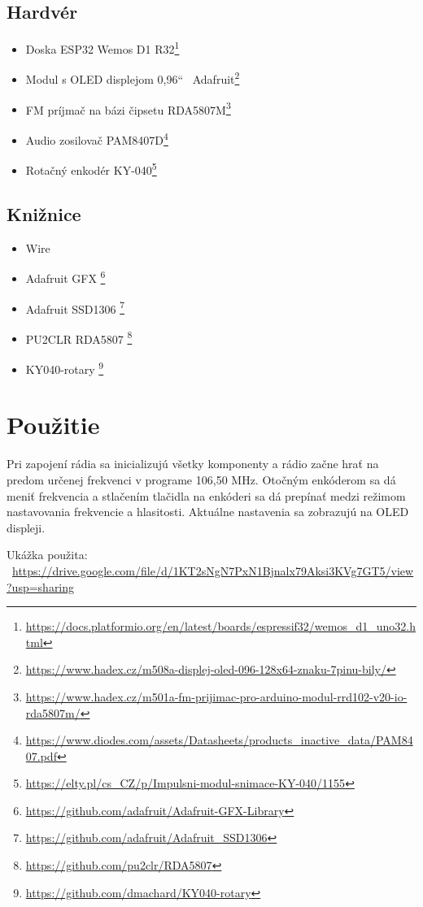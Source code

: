 \documentclass[11pt, a4paper]{article}
\begin{document}
\subsection{Hardvér}
\begin{itemize}
    \item Doska ESP32 Wemos D1 R32\footnote{\url{https://docs.platformio.org/en/latest/boards/espressif32/wemos_d1_uno32.html}}
    \item Modul s OLED displejom 0,96`` \-\ Adafruit\footnote{\url{https://www.hadex.cz/m508a-displej-oled-096-128x64-znaku-7pinu-bily/}}
    \item FM príjmač na bázi čipsetu RDA5807M\footnote{\url{https://www.hadex.cz/m501a-fm-prijimac-pro-arduino-modul-rrd102-v20-io-rda5807m/}}
    \item Audio zosilovač PAM8407D\footnote{\url{https://www.diodes.com/assets/Datasheets/products_inactive_data/PAM8407.pdf}}
    \item Rotačný enkodér KY-040\footnote{\url{https://elty.pl/cs_CZ/p/Impulsni-modul-snimace-KY-040/1155}}
\end{itemize}
\subsection{Knižnice}
\begin{itemize}
    \item Wire 
    \item Adafruit GFX \footnote{\url{https://github.com/adafruit/Adafruit-GFX-Library}}
    \item Adafruit SSD1306 \footnote{\url{https://github.com/adafruit/Adafruit_SSD1306}}
    \item PU2CLR RDA5807 \footnote{\url{https://github.com/pu2clr/RDA5807}} 
    \item KY040-rotary \footnote{\url{https://github.com/dmachard/KY040-rotary}} 
\end{itemize}

\section{Použitie}
Pri zapojení rádia sa inicializujú všetky komponenty a rádio začne hrať na predom
určenej frekvenci v programe 106,50 MHz. Otočným enkóderom sa 
dá meniť frekvencia a stlačením tlačidla na enkóderi sa dá prepínať medzi 
režimom nastavovania frekvencie a hlasitosti. Aktuálne nastavenia sa zobrazujú 
na OLED displeji.

Ukážka použita: \-\ \url{https://drive.google.com/file/d/1KT2sNgN7PxN1Bjnalx79Aksi3KVg7GT5/view?usp=sharing}
\end{document}
